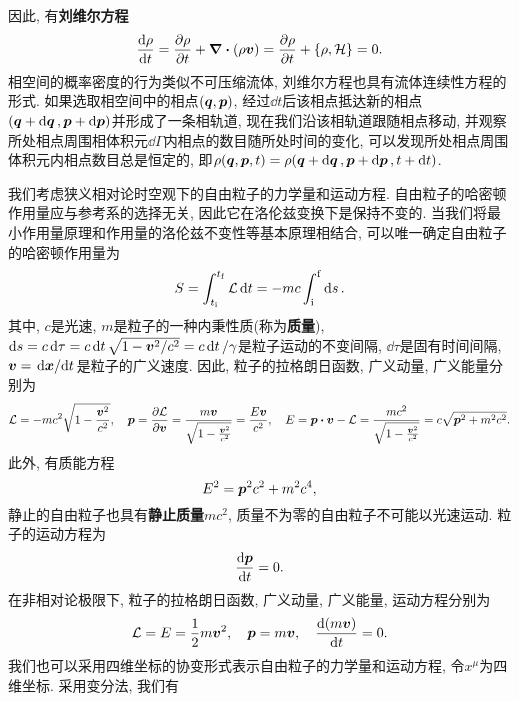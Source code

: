 因此, 有\textbf{刘维尔方程}
\begin{equation}
    \dv{\rho}{t} = \pdv{\rho}{t}+ \div{(\rho \vb*{v})} = \pdv{\rho}{t}+\pb{\rho}{\hami} = 0.
\end{equation}
相空间的概率密度的行为类似不可压缩流体, 刘维尔方程也具有流体连续性方程的形式. 如果选取相空间中的相点$ (\vb*{q},\vb*{p}) $, 经过$ \dd{t} $后该相点抵达新的相点$ (\vb*{q}+\dd{\vb*{q}},\vb*{p}+\dd{\vb*{p}}) $并形成了一条相轨道, 现在我们沿该相轨道跟随相点移动, 并观察所处相点周围相体积元$ \dd{\varGamma} $内相点的数目随所处时间的变化, 可以发现所处相点周围体积元内相点数目总是恒定的, 即$ \rho(\vb*{q},\vb*{p},t)=\rho(\vb*{q}+\dd{\vb*{q}},\vb*{p}+\dd{\vb*{p}},t+\dd{t}) $.

我们考虑狭义相对论时空观下的自由粒子的力学量和运动方程. 自由粒子的哈密顿作用量应与参考系的选择无关, 因此它在洛伦兹变换下是保持不变的. 当我们将最小作用量原理和作用量的洛伦兹不变性等基本原理相结合, 可以唯一确定自由粒子的哈密顿作用量为
\begin{equation*}
    S = \int_{t_{\mathrm{i}}}^{t_{\mathrm{f}}} \mathcal{L} \dd{t} = -mc \int_{\mathrm{i}}^{\mathrm{f}} \dd{s}.
\end{equation*}
其中, $ c $是光速, $ m $是粒子的一种内秉性质(称为\textbf{质量}), $ \dd{s} = c \dd{\tau} = c\dd{t} \sqrt{1-\vb*{v}^2/c^2} = c \dd{t}/\gamma $是粒子运动的不变间隔, $ \dd{\tau} $是固有时间间隔, $ \vb*{v} = \dv*{\vb*{x}}{t} $是粒子的广义速度. 因此, 粒子的拉格朗日函数, 广义动量, 广义能量分别为
\begin{equation*}
    \lagr = -mc^2 \sqrt{1-\frac{\vb*{v}^2}{c^2}}, \quad \vb*{p} = \pdv{\lagr}{\vb*{v}} = \frac{m\vb*{v}}{\sqrt{1-\frac{\vb*{v}^2}{c^2}}} = \frac{E \vb*{v}}{c^2}, \quad E = \vb*{p} \vdot \vb*{v} - \lagr = \frac{mc^2}{\sqrt{1-\frac{\vb*{v}^2}{c^2}}} = c \sqrt{\vb*{p}^2 + m^2 c^2}.
\end{equation*}
此外, 有质能方程
\begin{equation}
    E^2 = \vb*{p}^2 c^2 + m^2 c^4,
\end{equation}
静止的自由粒子也具有\textbf{静止质量}$ mc^2 $, 质量不为零的自由粒子不可能以光速运动. 粒子的运动方程为
\begin{equation}
    \dv{\vb*{p}}{t}=0.
\end{equation}
在非相对论极限下, 粒子的拉格朗日函数, 广义动量, 广义能量, 运动方程分别为
\begin{equation*}
    \mathcal{L} = E = \frac{1}{2} m\vb*{v}^2, \quad \vb*{p} = m \vb*{v}, \quad \dv{(m\vb*{v})}{t}=0.
\end{equation*}
我们也可以采用四维坐标的协变形式表示自由粒子的力学量和运动方程, 令$ x^{\mu} $为四维坐标. 采用变分法, 我们有
